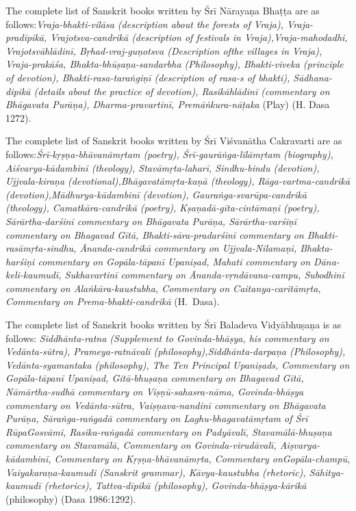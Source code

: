 The complete list of Sanskrit books written by Śrī Nārayaṇa Bhaṭṭa are as follows:{\sl  Vraja-bhakti-vilāsa {\rm (description about the forests of Vraja)}, Vraja-pradīpikā, Vrajotsva-candrikā {\rm (description of festivals in Vraja)},\break Vraja-mahodadhi, Vrajotsvāhlādinī, Bṛhad-vraj-guṇotsva {\rm (Description of\break the villages in Vraja)}, Vraja-prakāśa, Bhakta-bhūṣaṇa-sandarbha {\rm (Philosophy)}, Bhakti-viveka {\rm (principle of devotion)}, Bhakti-rasa-taraṅgiṇī {\rm (description of {\sl rasa}-s of {\sl bhakti})}, Sādhana-dipikā {\rm (details about the practice of devotion)}, Rasikāhlādinī {\rm (commentary on {\sl Bhāgavata Purāṇa})}, Dharma-pra\-vartinī, Premāṅkura-nāṭaka} {\rm (Play)} {\rm (H. Dasa 1272)}. 

{\rm The complete list of Sanskrit books written by Śrī Viśvanātha Cakra\-varti are as follows:}{\sl  Śrī-kṛṣṇa-bhāvanāmṛtam {\rm (poetry)}, Śrī-gaurāṅga-līlā\-mṛtam {\rm (biography)}, Aiśvarya-kādambinī {\rm (theology)}, Stavāmṛta-laharī, Sindhu-bindu {\rm (devotion)}, Ujjvala-kiraṇa  {\rm (devotional)},\break Bhāgavatāmṛta-kaṇā {\rm (theology)}, Rāga-vartma-candrikā {\rm (devotion)},\break Mādhurya-kādambinī {\rm (devotion)}, Gauraṅga-svarūpa-candrikā {\rm (theology)}, Camatkāra-candrikā {\rm (poetry)}, Kṣaṇadā-gīta-cintāmaṇi {\rm (poetry)}, Sārārtha-darśinī {\rm commentary on} Bhāgavata Purāṇa, Sārārtha-varśiṇī {\rm commentary on} Bhagavad Gītā, Bha\-kti-sāra-pradarśinī {\rm commentary on} Bhakti-rasā\-mṛ\-ta-sindhu, Ānanda-ca\-ndri\-kā {\rm commentary on} Ujjvala-Nilamaṇi, Bhakta-\Break harśiṇi {\rm commentary on} Gopāla-tāpanī Upaniṣad, Mahati {\rm commentary on} Dāna-keli-kaumudī, Sukhavartinī {\rm commentary on} Ānanda-vṛndāvana-\Break campu, Subodhinī commentary on Alaṅ\-kāra-kaustubha, {\rm Commentary on} Caitanya-caritā\-mṛta, {\rm Commentary on} Prema-bhakti-candrikā} {\rm (H.~Dasa)}. 

The complete list of Sanskrit books written by Śrī Baladeva Vidyā\-bhuṣaṇa is as follows: {\sl Siddhānta-ratna {\rm (Supplement to {\sl Govinda-bhāṣya}, his commentary on Vedānta-sūtra)}, Prameya-ratnāvalī {\rm (philosophy)},\break Siddhānta-darpaṇa {\rm (Philosophy)}, Vedānta-syamantaka {\rm (philosophy)}, The Ten Principal Upaniṣads, {\rm Commentary on} Gopāla-tāpanī Upaniṣad, Gitā-bhuṣaṇa {\rm commentary on} Bhagavad Gītā, Nāmārtha-sudhā {\rm commentary on} Viṣṇū-sahasra-nāma, Govinda-bhāṣya {\rm commentary on} Vedā\-nta-sūtra, Vaiṣṇava-nandinī {\rm commentary on} Bhāgavata Purāṇa, Sāraṅga-raṅgadā {\rm commentary on} Laghu-bhagavatāmṛtam {\rm of Śrī Rūpa\break Gosvāmi}, Rasika-raṅgadā {\rm commentary on} Padyāvalī, Stavamālā-bhuṣaṇa {\rm commentary on} Stavamālā, {\rm Commentary on} Govinda-virudāvalī, Aiṣva\-rya-kādambinī, {\rm Commentary on} Kṛṣṇa-bhāvanāmṛta, {\rm Commentary on}\break Gopāla-champū, Vai\-ya\-karaṇa-kaumudi {\rm (Sanskrit grammar)}, Kāvya-\Break kau\-stubha {\rm (rhetoric)}, Sā\-hitya-kaumudī {\rm (rhetorics)}, Tattva-dīpikā {\rm (philosophy)}, Govinda-bhāṣya-kārikā} {\rm (philosophy)} {\rm (Dasa 1986:1292)}. 

